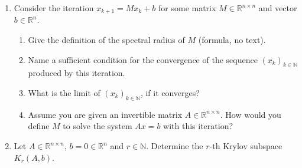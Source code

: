 \vspace*{-0.5cm}
\begin{enumerate}
	\item Consider the iteration $x_{k+1} = Mx_k + b$ for some matrix $M \in \mathbb{R}^{n \times n}$ and vector $b \in \mathbb{R}^n$. 
	\begin{enumerate}
		\item Give the definition of the spectral radius of $M$ (formula, no text).
		\item Name a sufficient condition for the convergence of the sequence $(x_k)_{k\in\mathbb{N}}$ produced by this iteration.
		\item What is the limit of $(x_k)_{k\in\mathbb{N}}$, if it converges? 
		\item Assume you are given an invertible matrix $A \in \mathbb{R}^{n \times n}$. How would you define $M$ to solve the system $Ax=b$ with this iteration?
	\end{enumerate} 
	\item Let $A \in \mathbb{R}^{n \times n}$, $b = 0\in \mathbb{R}^{n}$ and $r\in \mathbb{N}$. Determine the $r$-th Krylov subspace $K_r(A,b)$.
\end{enumerate}
 